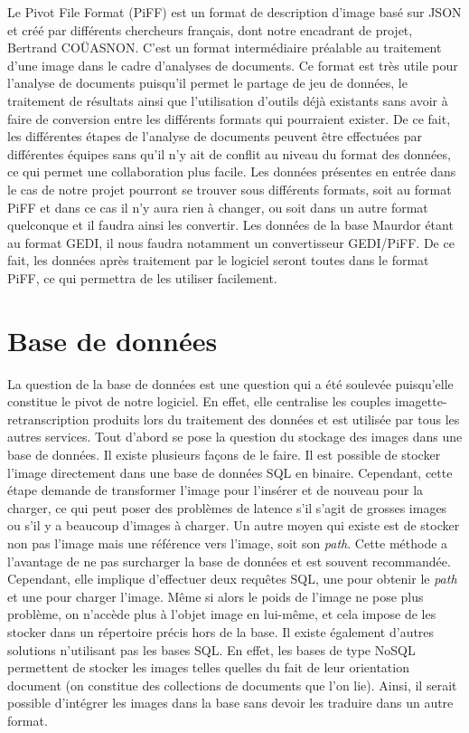 Le Pivot File Format (PiFF) est un format de description d'image basé sur JSON et créé par différents
chercheurs français, dont notre encadrant de projet, Bertrand COÜASNON. C’est un format intermédiaire préalable
au traitement d’une image dans le cadre d’analyses de documents. Ce format est très utile pour l'analyse
de documents puisqu'il permet le partage de jeu de données, le traitement de résultats ainsi que
l'utilisation d'outils déjà existants sans avoir à faire de conversion entre les différents formats
qui pourraient exister. De ce fait, les différentes étapes de l'analyse de documents peuvent être effectuées
par différentes équipes sans qu'il n'y ait de conflit au niveau du format des données, ce qui permet une
collaboration plus facile. Les données présentes en entrée dans le cas de notre projet pourront se trouver
sous différents formats, soit au format PiFF et dans ce cas il n’y aura rien à changer, ou soit dans un autre
format quelconque et il faudra ainsi les convertir. Les données de la base Maurdor étant au format GEDI,
il nous faudra notamment un convertisseur GEDI/PiFF. De ce fait, les données après traitement par le logiciel
seront toutes dans le format PiFF, ce qui permettra de les utiliser facilement.

\section{Base de données}

La question de la base de données est une question qui a été soulevée puisqu’elle constitue le pivot de notre
logiciel. En effet, elle centralise les couples imagette-retranscription produits lors du traitement des données
et est utilisée par tous les autres services. Tout d’abord se pose la question du stockage des images dans
une base de données. Il existe plusieurs façons de le faire. Il est possible de stocker l’image directement dans
une base de données SQL en binaire. Cependant, cette étape demande de transformer l’image pour l'insérer et de nouveau
pour la charger, ce qui peut poser des problèmes de latence s’il s’agit de grosses images ou s'il y a beaucoup
d’images à charger. Un autre moyen qui existe est de stocker non pas l’image mais une référence vers l’image,
soit son \textit{path}. Cette méthode a l’avantage de ne pas surcharger la base de données et est souvent recommandée.
Cependant, elle implique d’effectuer deux requêtes SQL, une pour obtenir le \textit{path} et une pour charger l’image.
Même si alors le poids de l’image ne pose plus problème, on n’accède plus à l’objet image en lui-même, et cela impose de les
stocker dans un répertoire précis hors de la base. Il existe également d’autres solutions n'utilisant pas les bases SQL.
En effet, les bases de type NoSQL permettent de stocker les images telles quelles du fait de leur orientation document
(on constitue des collections de documents que l'on lie). Ainsi, il serait possible d’intégrer les images dans la base
sans devoir les traduire dans un autre format.

